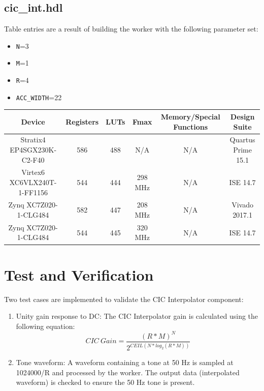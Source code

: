 \documentclass{article}
\def\comp{cic\_int}
\begin{document}
\subsection*{\comp.hdl}
Table entries are a result of building the worker with the following parameter set:
\begin{itemize}
	\item \verb+N+=3
	\item \verb+M+=1
	\item \verb+R+=4
	\item \verb+ACC_WIDTH+=22
\end{itemize}

\begin{scriptsize}
	\begin{tabular}{|c|c|c|c|c|c|}
		\hline
		\rowcolor{blue}
		Device                      & Registers & LUTs & Fmax    & Memory/Special Functions & Design Suite    \\
		\hline
		Stratix4 EP4SGX230K-C2-F40  & 586       & 488  & N/A       & N/A                      & Quartus Prime 15.1 \\
		\hline
		Virtex6 XC6VLX240T-1-FF1156 & 544       & 444  & 298 MHz & N/A                      & ISE 14.7        \\
		\hline
		Zynq XC7Z020-1-CLG484       & 582       & 447  & 208 MHz & N/A                      & Vivado 2017.1        \\
		\hline
		Zynq XC7Z020-1-CLG484       & 544       & 445  & 320 MHz & N/A                      & ISE 14.7        \\
		\hline
	\end{tabular}
\end{scriptsize}
\newpage
\section*{Test and Verification}
Two test cases are implemented to validate the CIC Interpolator component:

\begin{enumerate}
	\item Unity gain response to DC: The CIC Interpolator gain is calculated using the following equation:
	      \begin{equation} \label{eq:cic_gain}
	      	CIC\ Gain = \frac{(R*M)^N}{2^{CEIL(N*log_2(R*M))}}
	      \end{equation}
	\item Tone waveform: A waveform containing a tone at 50 Hz is sampled at 1024000/R and processed by the worker. The output data (interpolated waveform) is checked to ensure the 50 Hz tone is present.
\end{enumerate}\medskip
\end{document}
